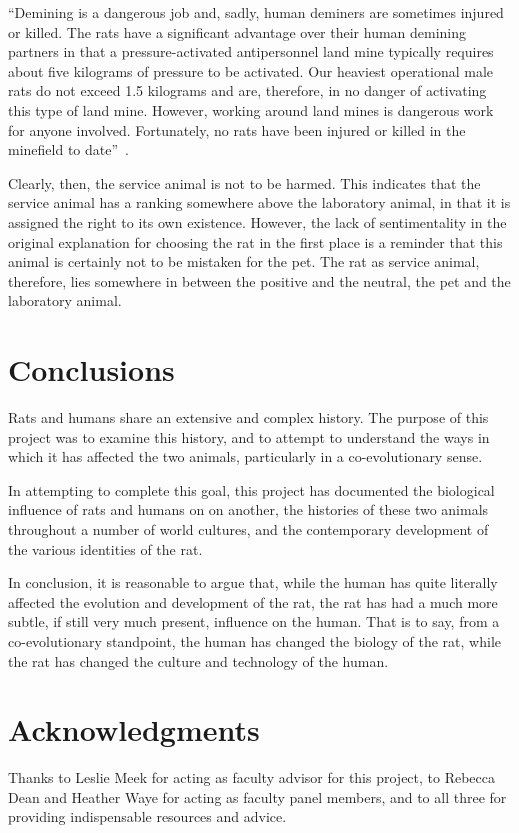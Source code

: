 \documentclass[12pt]{article}
\begin{document}
``Demining is a dangerous job and, sadly, human deminers are sometimes injured or killed. The rats have a significant advantage over their human demining partners in that a pressure-activated antipersonnel land mine typically requires about five kilograms of pressure to be activated. Our heaviest operational male rats do not exceed 1.5 kilograms and are, therefore, in no danger of activating this type of land mine. However, working around land mines is dangerous work for anyone involved. Fortunately, no rats have been injured or killed in the minefield to date''~\cite{APOPO}.

Clearly, then, the service animal is not to be harmed. This indicates that the service animal has a ranking somewhere above the laboratory animal, in that it is assigned the right to its own existence. However, the lack of sentimentality in the original explanation for choosing the rat in the first place is a reminder that this animal is certainly not to be mistaken for the pet. The rat as service animal, therefore, lies somewhere in between the positive and the neutral, the pet and the laboratory animal.

\section{Conclusions} \label{Conclusions}

Rats and humans share an extensive and complex history. The purpose of this project was to examine this history, and to attempt to understand the ways in which it has affected the two animals, particularly in a co-evolutionary sense.

In attempting to complete this goal, this project has documented the biological influence of rats and humans on on another, the histories of these two animals throughout a number of world cultures, and the contemporary development of the various identities of the rat.

In conclusion, it is reasonable to argue that, while the human has quite literally affected the evolution and development of the rat, the rat has had a much more subtle, if still very much present, influence on the human. That is to say, from a co-evolutionary standpoint, the human has changed the biology of the rat, while the rat has changed the culture and technology of the human.

\section{Acknowledgments}

Thanks to Leslie Meek for acting as faculty advisor for this project, to Rebecca Dean and Heather Waye for acting as faculty panel members, and to all three for providing indispensable resources and advice.

\pagebreak



\end{document}
